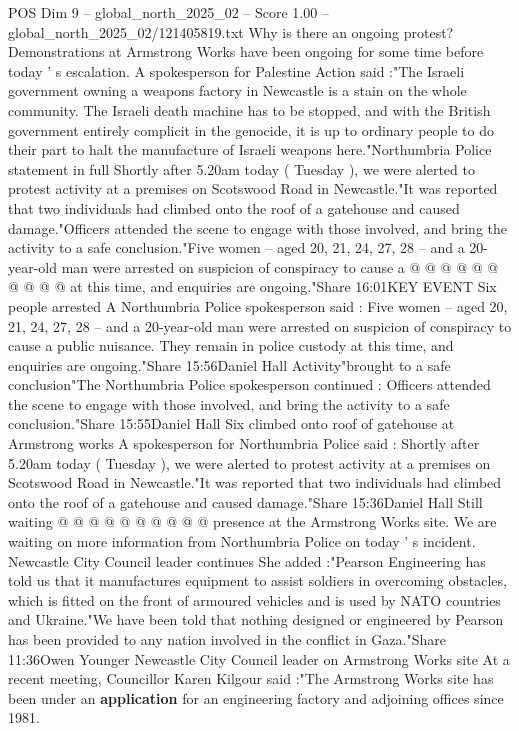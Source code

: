 \begin{textsample}{POS Dim 9 – global\_north\_2025\_02 – Score 1.00 – global\_north\_2025\_02/121405819.txt}  \label{ex:f9_pos_390}
Why is there an ongoing protest?
Demonstrations at Armstrong Works have been ongoing for some time before today ' s escalation.
A spokesperson for Palestine Action said :"The Israeli government owning a weapons factory in Newcastle is a stain on the whole community.
The Israeli death machine has to be stopped, and with the British government entirely complicit in the genocide, it is up to ordinary people to do their part to halt the manufacture of Israeli weapons here."Northumbria Police statement in full Shortly after 5.20am today ( Tuesday ), we were alerted to protest activity at a premises on Scotswood Road in Newcastle."It was reported that two individuals had climbed onto the roof of a gatehouse and caused damage."Officers attended the scene to engage with those involved, and bring the activity to a safe conclusion."Five women -- aged 20, 21, 24, 27, 28 -- and a 20-year-old man were arrested on suspicion of conspiracy to cause a @ @ @ @ @ @ @ @ @ @ at this time, and enquiries are ongoing."Share 16:01KEY EVENT Six people arrested A Northumbria Police spokesperson said : Five women -- aged 20, 21, 24, 27, 28 -- and a 20-year-old man were arrested on suspicion of conspiracy to cause a public nuisance.
They remain in police custody at this time, and enquiries are ongoing."Share 15:56Daniel Hall Activity"brought to a safe conclusion"The Northumbria Police spokesperson continued : Officers attended the scene to engage with those involved, and bring the activity to a safe conclusion."Share 15:55Daniel Hall Six climbed onto roof of gatehouse at Armstrong works A spokesperson for Northumbria Police said : Shortly after 5.20am today ( Tuesday ), we were alerted to protest activity at a premises on Scotswood Road in Newcastle."It was reported that two individuals had climbed onto the roof of a gatehouse and caused damage."Share 15:36Daniel Hall Still waiting @ @ @ @ @ @ @ @ @ @ presence at the Armstrong Works site.
We are waiting on more information from Northumbria Police on today ' s incident.
Newcastle City Council leader continues She added :"Pearson Engineering has told us that it manufactures equipment to assist soldiers in overcoming obstacles, which is fitted on the front of armoured vehicles and is used by NATO countries and Ukraine."We have been told that nothing designed or engineered by Pearson has been provided to any nation involved in the conflict in Gaza."Share 11:36Owen Younger Newcastle City Council leader on Armstrong Works site At a recent meeting, Councillor Karen Kilgour said :"The Armstrong Works site has been under an \textbf{application} for an engineering factory and adjoining offices since 1981.

\end{textsample}
